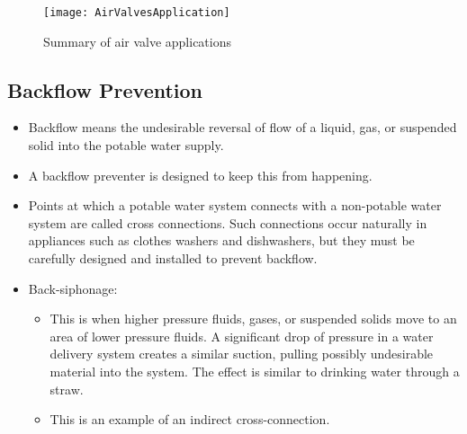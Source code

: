 \thispagestyle{empty}
\begin{landscape}
 \vspace{3cm}
\hspace{1cm}
\begin{figure}
     \texttt{[image: AirValvesApplication]}
     \caption{Summary of air valve applications}
\label{fig:Airvalve1}
     \end{figure}
     \end{landscape}

\subsection{Backflow Prevention}
\begin{itemize}[itemsep=0.5em,parsep=-0.5em]
\item Backflow means the undesirable reversal of flow of a liquid, gas, or suspended solid into the potable water supply.
\item A backflow preventer is designed to keep this from happening. 
\item Points at which a potable water system connects with a non-potable water system are called cross connections. Such connections occur naturally in appliances such as clothes washers and dishwashers, but they must be carefully designed and installed to prevent backflow. 
\item Back-siphonage:
\begin{itemize}
\item This is when higher pressure fluids, gases, or suspended solids move to an area of lower pressure fluids. A significant drop of pressure in a water delivery system creates a similar suction, pulling possibly undesirable material into the system. The effect is similar to drinking water through a straw. 
\item This is an example of an indirect cross-connection.
\end{itemize}


\end{itemize}
